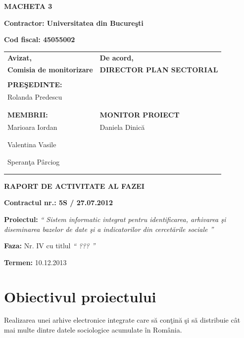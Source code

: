 \documentclass[a4paper, 10pt]{article}
\title{}
\author{}
\date{2013-04-08}
\begin{document}
{\raggedleft\bfseries
MACHETA 3
\par}

{\bfseries
Contractor: Universitatea din Bucure\c{s}ti}

{\textbf{Cod fiscal: 45055002}

\bigskip


\begin{tabular}{@{}l l}
\textbf{Avizat,}&\textbf{De acord,}\\
\textbf{Comisia de monitorizare}&\textbf{DIRECTOR PLAN SECTORIAL}\\
\\
\textbf{PRE\c{S}EDINTE:}&\\
Rolanda Predescu&\\
\\
\\
\textbf{MEMBRII:}&\textbf{MONITOR PROIECT}\\
Marioara Iordan&Daniela Dinic\u{a}\\
\\
\\
Valentina Vasile&\\
\\
\\
Speran\c{t}a P\^{a}rciog\\
\\
\\
\end{tabular}

\bigskip

\bigskip

{\centering\bfseries
RAPORT DE ACTIVITATE AL FAZEI
\par}

\bigskip

{\bfseries
Contractul nr.: 5S / 27.07.2012}

{
\textbf{Proiectul: }
\textit{`` Sistem informatic integrat pentru identificarea, arhivarea \c{s}i diseminarea bazelor de date \c{s}i a indicatorilor din
cercet\u{a}rile sociale ''}}

{
\textbf{Faza: }
Nr. IV cu titlul
\textit{`` ??? ''}}

{\textbf{Termen:} 10.12.2013}

\medskip

\section{Obiectivul proiectului}

Realizarea unei arhive electronice integrate care s\u{a}
con\c{t}in\u{a} \c{s}i s\u{a} distribuie c\^at mai multe dintre 
datele sociologice acumulate \^in Rom\^ania.

}
\end{document}
